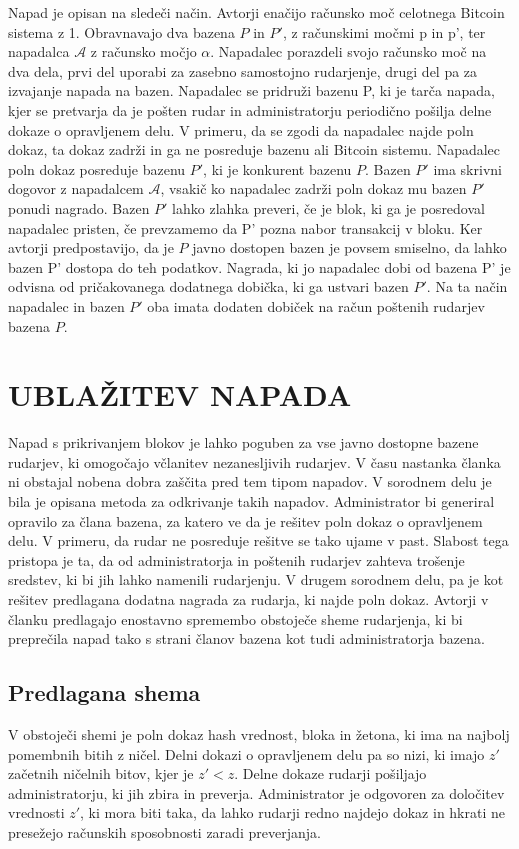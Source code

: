 \documentclass{acm_proc_article-sp}
\begin{document}
Napad je opisan na sledeči način. Avtorji enačijo računsko moč celotnega Bitcoin sistema z 1. Obravnavajo dva bazena $P$ in $P'$, z računskimi močmi p in p', ter napadalca $\mathcal{A}$ z računsko močjo $\alpha$. Napadalec porazdeli svojo računsko moč na dva dela, prvi del uporabi za zasebno samostojno rudarjenje, drugi del pa za izvajanje napada na bazen. Napadalec se pridruži bazenu P, ki je tarča napada, kjer se pretvarja da je pošten rudar in administratorju periodično pošilja delne dokaze o opravljenem delu. V primeru, da se zgodi da napadalec najde poln dokaz, ta dokaz zadrži in ga ne posreduje bazenu ali Bitcoin sistemu.
Napadalec poln dokaz posreduje bazenu $P'$, ki je konkurent bazenu $P$. Bazen $P'$ ima skrivni dogovor z napadalcem $\mathcal{A}$, vsakič ko napadalec zadrži poln dokaz mu bazen $P'$ ponudi nagrado. Bazen $P'$ lahko zlahka preveri, če je blok, ki ga je posredoval napadalec pristen, če prevzamemo da P' pozna nabor transakcij v bloku. Ker avtorji predpostavijo, da je $P$ javno dostopen bazen je povsem smiselno, da lahko bazen P' dostopa do teh podatkov. Nagrada, ki jo napadalec dobi od bazena P' je odvisna od pričakovanega dodatnega dobička, ki ga ustvari bazen $P'$. Na ta način napadalec in bazen $P'$ oba imata dodaten dobiček na račun poštenih rudarjev bazena $P$. 


\section{UBLAŽITEV NAPADA} \label{sekcija3}
Napad s prikrivanjem blokov je lahko poguben za vse javno dostopne bazene rudarjev, ki omogočajo včlanitev nezanesljivih rudarjev. V času nastanka članka ni obstajal nobena dobra zaščita pred tem tipom napadov. V sorodnem delu je bila je opisana metoda za odkrivanje takih napadov. Administrator bi generiral opravilo za člana bazena, za katero ve da je rešitev poln dokaz o opravljenem delu. V primeru, da rudar ne posreduje rešitve se tako ujame v past. Slabost tega pristopa je ta, da od administratorja in poštenih rudarjev zahteva trošenje sredstev, ki bi jih lahko namenili rudarjenju. V drugem sorodnem delu, pa je kot rešitev predlagana dodatna nagrada za rudarja, ki najde poln dokaz.
Avtorji v članku predlagajo enostavno spremembo obstoječe sheme rudarjenja, ki  bi preprečila napad tako s strani članov bazena kot tudi administratorja bazena.


\subsection{Predlagana shema}
V obstoječi shemi je poln dokaz hash vrednost, bloka in žetona, ki ima na najbolj pomembnih bitih z ničel. Delni dokazi o opravljenem delu pa so nizi, ki imajo $z'$ začetnih ničelnih bitov, kjer je $z' < z$.
Delne dokaze rudarji pošiljajo administratorju, ki jih zbira in preverja. Administrator je odgovoren za določitev vrednosti $z'$, ki mora biti taka, da lahko rudarji redno najdejo dokaz in hkrati ne presežejo računskih sposobnosti zaradi preverjanja.
 
\end{document}
